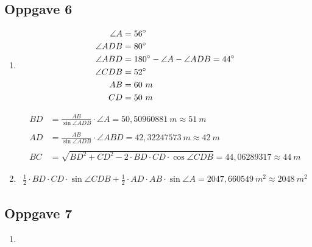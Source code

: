\documentclass[11pt,a4paper]{report}
\newcommand{\m}{\cdot}
\newcommand{\opgd}[1]{\item[#1)]}
\newcommand{\opg}[1]{\subsection*{Oppgave #1}}
\begin{document}
\newpage
\opg{6}
\begin{enumerate}[leftmargin=*,itemsep=1cm,labelsep=2em,label=\alph*)]
\opgd{a}
\begin{align*}
\angle A &= 56 \degree\\
\angle ADB &= 80 \degree\\
\angle ABD &= 180 \degree - \angle A - \angle ADB = 44 \degree\\
\angle CDB &= 52 \degree\\
AB &= 60\ m\\
CD &= 50\ m
\end{align*}

\begin{align*}
BD &= \frac{AB}{\sin \angle ADB} \m \angle A = 50,50960881\ m \approx 51\ m\\\\
AD &= \frac{AB}{\sin \angle ADB} \m \angle ABD = 42,32247573\ m \approx 42\ m\\\\
BC &= \sqrt{BD^2 + CD^2 - 2 \m BD \m CD \m \cos \angle CDB} = 44,06289317 \approx 44\ m
\end{align*}

\begin{center}\end{center}

\opgd{b}
\begin{align*}
\frac{1}{2} \m BD \m CD \m \sin \angle CDB + \frac{1}{2} \m AD \m AB \m \sin \angle A = 2047,660549\ m^2 \approx 2048\ m^2
\end{align*}

\begin{center}\end{center}

\end{enumerate}


\opg{7}
\begin{enumerate}[leftmargin=*,itemsep=1cm,labelsep=2em,label=\alph*)]
\item[]

\end{enumerate}
\end{document}
